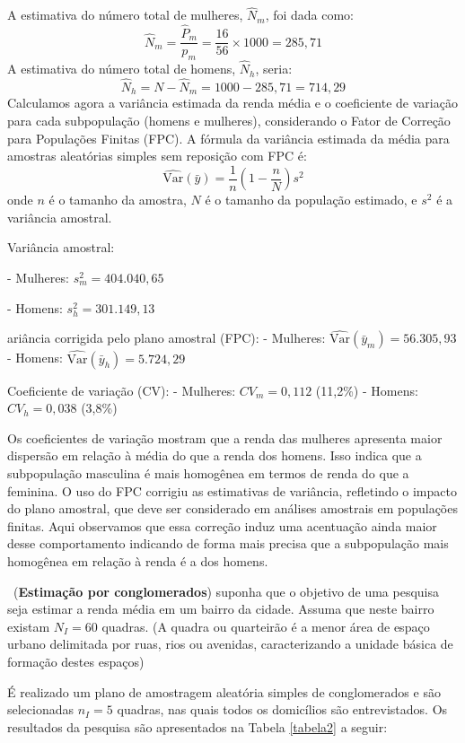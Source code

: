 \documentclass[a4paper,12pt,oneside,twocolumn]{Config/milktest}
\begin{document}
{\begin{itemize}
A estimativa do número total de mulheres, \( \hat{N}_m \), foi dada como:
   \[
   \hat{N}_m = \frac{\hat{P}_m}{p_m} = \frac{16}{56} \times 1000 = 285,71
   \]
A estimativa do número total de homens, \( \hat{N}_h \), seria:
   \[
   \hat{N}_h = N - \hat{N}_m = 1000 - 285,71 = 714,29
   \]
   Calculamos agora a variância estimada da renda média e o coeficiente de variação para cada subpopulação (homens e mulheres), considerando o Fator de Correção para Populações Finitas (FPC).
   A fórmula da variância estimada da média para amostras aleatórias simples sem reposição com FPC é:
\[
\hat{\text{Var}}(\bar{y}) = \frac{1}{n}\left(1 - \frac{n}{N}\right) s^2
\]
onde \( n \) é o tamanho da amostra, \( N \) é o tamanho da população estimado, e \( s^2 \) é a variância amostral.

Variância amostral:
   
   - Mulheres: \( s^2_m = 404.040,65 \)
   
   - Homens: \( s^2_h = 301.149,13 \)

ariância corrigida pelo plano amostral (FPC):
   - Mulheres: \( \hat{\text{Var}}(\bar{y}_{m}) = 56.305,93 \)
   - Homens: \( \hat{\text{Var}}(\bar{y}_{h}) = 5.724,29 \)

Coeficiente de variação (CV):
   - Mulheres: \( CV_{m} = 0,112 \) (11,2\%)
   - Homens: \( CV_{h} = 0,038 \) (3,8\%)

Os coeficientes de variação mostram que a renda das mulheres apresenta maior dispersão em relação à média do que a renda dos homens. Isso indica que a subpopulação masculina é mais homogênea em termos de renda do que a feminina. O uso do FPC corrigiu as estimativas de variância, refletindo o impacto do plano amostral, que deve ser considerado em análises amostrais em populações finitas. Aqui observamos que essa correção induz uma acentuação ainda maior desse comportamento indicando de forma mais precisa que a subpopulação mais homogênea em relação à renda é a dos homens.
\end{itemize}
}

\medskip 
\question~({\bf Estimação por conglomerados}) suponha que o objetivo de uma pesquisa seja estimar a renda média em um bairro da cidade. Assuma que neste bairro existam \(N_I = 60\) quadras. {\scriptsize (A quadra ou quarteirão é a menor área de espaço urbano delimitada por ruas, rios ou avenidas, caracterizando a unidade básica de formação destes espaços)} 

É realizado um plano de amostragem aleatória simples de conglomerados e são selecionadas \(n_I = 5\) quadras, nas quais todos os domicílios são entrevistados. Os resultados da pesquisa são apresentados na Tabela \ref{tabela2} a seguir:
\end{document}
